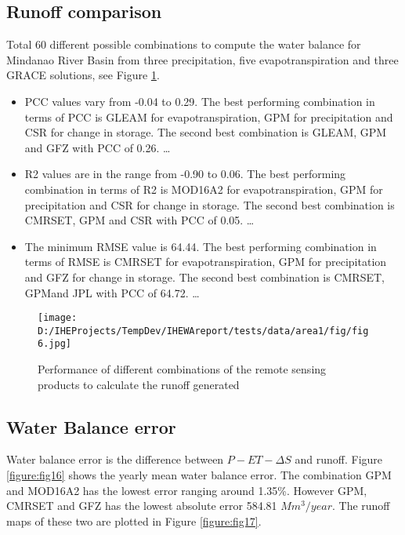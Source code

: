 \documentclass{article}%
\begin{document}
\subsection{Runoff comparison}%
\label{subsec:Runoffcomparison}%
Total 60 different possible combinations to compute the water balance for Mindanao River Basin from three precipitation, five evapotranspiration and three GRACE solutions, see Figure \ref{figure:fig15}.%
\linebreak%
\begin{itemize}%
\item%
PCC values vary from {-}0.04 to 0.29. The best performing combination in terms of PCC is GLEAM for evapotranspiration, GPM for precipitation and CSR for change in storage. The second best combination is GLEAM, GPM and GFZ with PCC of 0.26.%
\ldots%
\item%
R2 values are in the range from {-}0.90 to 0.06. The best performing combination in terms of R2 is MOD16A2 for evapotranspiration, GPM for precipitation and CSR for change in storage. The second best combination is CMRSET, GPM and CSR with PCC of 0.05.%
\ldots%
\item%
The minimum RMSE value is 64.44. The best performing combination in terms of RMSE is CMRSET for evapotranspiration, GPM for precipitation and GFZ for change in storage. The second best combination is CMRSET, GPMand JPL with PCC of 64.72.%
\ldots%
\end{itemize}%


\begin{figure}[H]%
\centering%
\texttt{[image: D:/IHEProjects/TempDev/IHEWAreport/tests/data/area1/fig/fig6.jpg]}%
\caption{Performance of different combinations of the remote sensing products to calculate the runoff generated}%
\label{figure:fig15}%
\end{figure}

%
\subsection{Water Balance error}%
\label{subsec:WaterBalanceerror}%
Water balance error is the difference between $P-ET-\Delta S$ and runoff. Figure \ref{figure:fig16} shows the yearly mean water balance error. The combination GPM and MOD16A2 has the lowest error ranging around 1.35\%. However GPM, CMRSET and GFZ has the lowest absolute error 584.81 $Mm^3/year$. The runoff maps of these two are plotted in Figure \ref{figure:fig17}.%
\linebreak%
\end{document}
